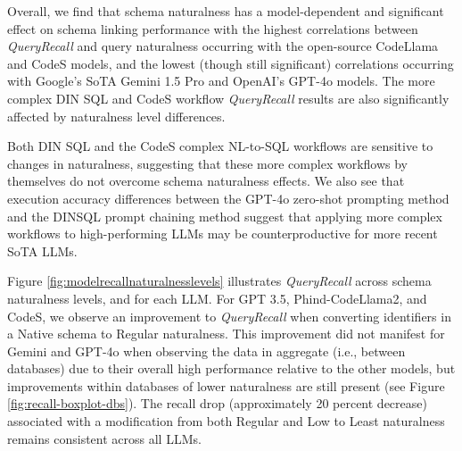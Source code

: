 Overall, we find that schema naturalness has a model-dependent and significant effect on schema linking performance with the highest correlations between \emph{QueryRecall} and query naturalness occurring with the open-source CodeLlama and CodeS models, and the lowest (though still significant) correlations occurring with Google's SoTA Gemini 1.5 Pro and OpenAI's GPT-4o models.
The more complex DIN SQL and CodeS workflow \emph{QueryRecall} results are also significantly affected by naturalness level differences.

Both DIN SQL and the CodeS complex NL-to-SQL workflows are sensitive to changes in naturalness, suggesting that these more complex workflows by themselves do not overcome schema naturalness effects.  
We also see that execution accuracy differences between the GPT-4o zero-shot prompting method and the DINSQL prompt chaining method suggest that applying more complex workflows to high-performing LLMs may be counterproductive for more recent SoTA LLMs.

Figure \ref{fig:modelrecallnaturalnesslevels} illustrates \emph{QueryRecall} across schema naturalness levels, and for each LLM.
For GPT 3.5, Phind-CodeLlama2, and CodeS, we observe an improvement to \emph{QueryRecall} when converting identifiers in a Native schema to Regular naturalness.
This improvement did not manifest for Gemini and GPT-4o when observing the data in aggregate (i.e., between databases) due to their overall high performance relative to the other models, but improvements within databases of lower naturalness are still present (see Figure \ref{fig:recall-boxplot-dbs}).
The recall drop (approximately 20 percent decrease) associated with a modification from both Regular and Low to Least naturalness remains consistent across all LLMs.

